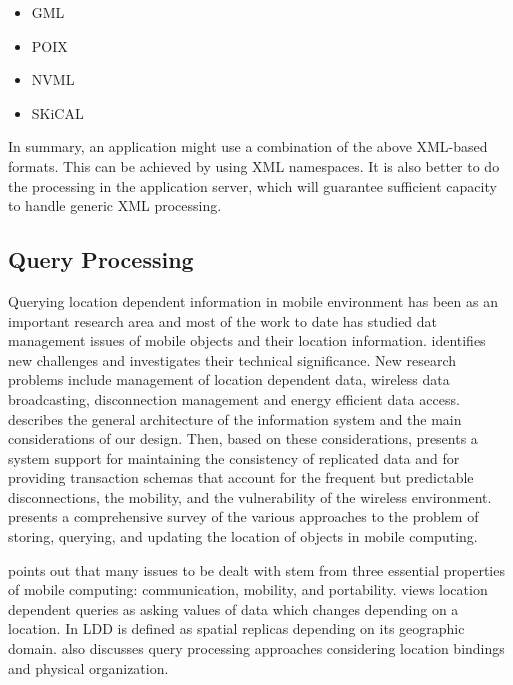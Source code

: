 \documentclass[12pt,a4paper,titlepage]{article}
\begin{document}
\begin{itemize}
	\item GML \cite{gml}
	\item POIX \cite{poix}
	\item NVML \cite{nvml}
	\item SKiCAL \cite{SKICal}
\end{itemize}

In summary, an application might use a combination of the above XML-based formats. This can be achieved by using XML namespaces. It is also better to do the processing in the application server, which will guarantee sufficient capacity to handle generic XML processing.

\subsection{Query Processing} %
\label{sub:query_processing}
Querying location dependent information in mobile environment has been as an important research area and most of the work to date has studied dat management issues of mobile objects and their location information. \cite{imielinski1993data} identifies new challenges and investigates their technical significance. New research problems include management of location dependent data, wireless data broadcasting, disconnection management and energy efficient data access. \cite{pitoura1994building} describes the general architecture of the information system and the main considerations of our design. Then, based on these considerations, \cite{pitoura1994building} presents a system support for maintaining the consistency of replicated data and for providing transaction schemas that account for the frequent but predictable disconnections, the mobility, and the vulnerability of the wireless environment. \cite{pitoura2001locating} presents a comprehensive survey of the various approaches to the problem of storing, querying, and updating the location of objects in mobile computing.

\cite{forman1994challenges} points out that many issues to be dealt with stem from three essential properties of mobile computing: communication, mobility, and portability. \cite{Dunham:1995:MCD:219713.219727} views location dependent queries as asking values of data which changes depending on a location. In \cite{Dunham:1998ci} LDD is defined as spatial replicas depending on its geographic domain. \cite{kumar1998defining} also discusses query processing approaches considering location bindings and physical organization.
\end{document}
